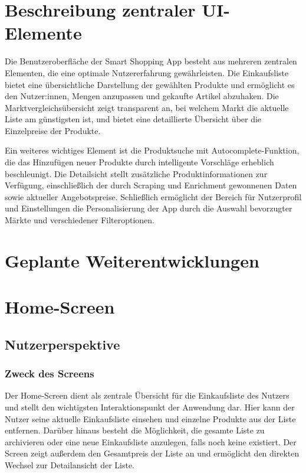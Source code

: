 \section{Beschreibung zentraler UI-Elemente}
Die Benutzeroberfläche der Smart Shopping App besteht aus mehreren zentralen Elementen, die eine optimale Nutzererfahrung gewährleisten. Die Einkaufsliste bietet eine übersichtliche Darstellung der gewählten Produkte und ermöglicht es den Nutzer:innen, Mengen anzupassen und gekaufte Artikel abzuhaken. Die Marktvergleichsübersicht zeigt transparent an, bei welchem Markt die aktuelle Liste am günstigsten ist, und bietet eine detaillierte Übersicht über die Einzelpreise der Produkte.

Ein weiteres wichtiges Element ist die Produktsuche mit Autocomplete-Funktion, die das Hinzufügen neuer Produkte durch intelligente Vorschläge erheblich beschleunigt. Die Detailsicht stellt zusätzliche Produktinformationen zur Verfügung, einschließlich der durch Scraping und Enrichment gewonnenen Daten sowie aktueller Angebotspreise. Schließlich ermöglicht der Bereich für Nutzerprofil und Einstellungen die Personalisierung der App durch die Auswahl bevorzugter Märkte und verschiedener Filteroptionen.

\section{Geplante Weiterentwicklungen}

\section{Home-Screen}
\label{sec:home_screen}

\subsection{Nutzerperspektive}

\subsubsection{Zweck des Screens}
Der Home-Screen dient als zentrale Übersicht für die Einkaufsliste des Nutzers und stellt den wichtigsten Interaktionspunkt der Anwendung dar. Hier kann der Nutzer seine aktuelle Einkaufsliste einsehen und einzelne Produkte aus der Liste entfernen. Darüber hinaus besteht die Möglichkeit, die gesamte Liste zu archivieren oder eine neue Einkaufsliste anzulegen, falls noch keine existiert. Der Screen zeigt außerdem den Gesamtpreis der Liste an und ermöglicht den direkten Wechsel zur Detailansicht der Liste.

